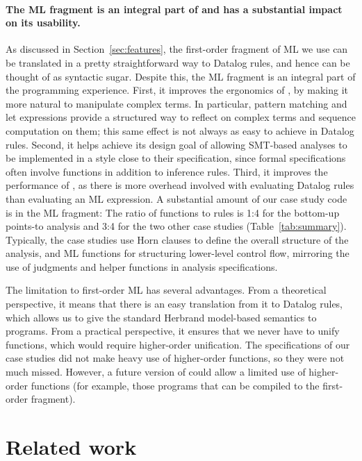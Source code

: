 \documentclass[acmsmall,screen,nonacm]{acmart}
\theoremstyle{definition}
\begin{document}
\paragraph{The ML fragment is an integral part of \Name and has a
substantial impact on its usability.}
As discussed in Section~\ref{sec:features}, the first-order fragment of ML we
use can be translated in a pretty straightforward way to Datalog rules, and
hence can be thought of as syntactic sugar.
Despite this, the ML fragment is an integral part of the \Name programming
experience.
First, it improves the ergonomics of \Name, by making it more natural to
manipulate complex terms.
In particular, pattern matching and let expressions provide a structured way to
reflect on complex terms and sequence computation on them; this same effect is
not always as easy to achieve in Datalog rules.
Second, it helps \Name achieve its design goal of allowing SMT-based analyses
to be implemented in a style close to their specification, since formal
specifications often involve functions in addition to inference rules.
Third, it improves the performance of \Name, as there is more overhead involved
with evaluating Datalog rules than evaluating an ML expression.
A substantial amount of our case study code is in the ML fragment:
The ratio of functions to rules is 1:4 for the bottom-up points-to analysis and
3:4 for the two other case studies (Table~\ref{tab:summary}).
Typically, the case studies use Horn clauses to define the overall structure of
the analysis, and ML functions for structuring lower-level control flow,
mirroring the use of judgments and helper functions in analysis specifications.

The limitation to first-order ML has several advantages.
From a theoretical perspective, it means that there is an easy translation from
it to Datalog rules, which allows us to give the standard Herbrand model-based
semantics to \Name programs.
From a practical perspective, it ensures that we never have to unify functions,
which would require higher-order unification.
The specifications of our case studies did not make heavy use of higher-order
functions, so they were not much missed.
However, a future version of \Name could allow a limited use of higher-order
functions (for example, those programs that can be compiled to the first-order
fragment).

\section{Related work}\label{sec:related}
\end{document}
